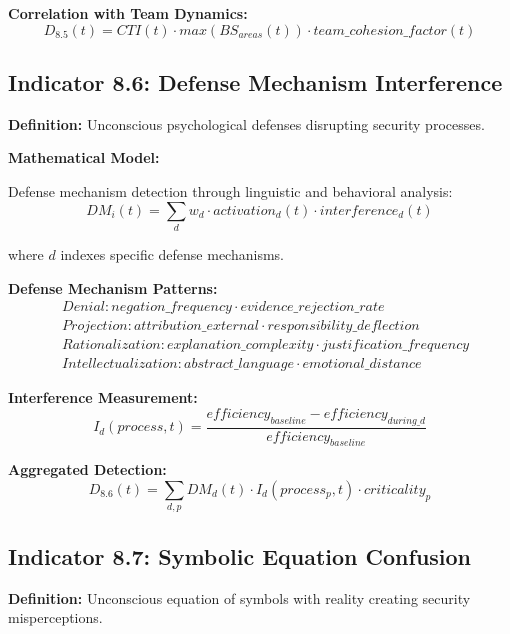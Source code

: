 \documentclass[11pt,a4paper]{article}
\begin{document}
\textbf{Correlation with Team Dynamics:}
\begin{equation}
D_{8.5}(t) = CTI(t) \cdot max(BS_{areas}(t)) \cdot team\_cohesion\_factor(t)
\end{equation}

\subsection{Indicator 8.6: Defense Mechanism Interference}

\textbf{Definition:} Unconscious psychological defenses disrupting security processes.

\textbf{Mathematical Model:}

Defense mechanism detection through linguistic and behavioral analysis:
\begin{equation}
DM_i(t) = \sum_{d} w_d \cdot activation_d(t) \cdot interference_d(t)
\end{equation}

where $d$ indexes specific defense mechanisms.

\textbf{Defense Mechanism Patterns:}
\begin{align}
&Denial: negation\_frequency \cdot evidence\_rejection\_rate \\
&Projection: attribution\_external \cdot responsibility\_deflection \\
&Rationalization: explanation\_complexity \cdot justification\_frequency \\
&Intellectualization: abstract\_language \cdot emotional\_distance
\end{align}

\textbf{Interference Measurement:}
\begin{equation}
I_d(process,t) = \frac{efficiency_{baseline} - efficiency_{during\_d}}{efficiency_{baseline}}
\end{equation}

\textbf{Aggregated Detection:}
\begin{equation}
D_{8.6}(t) = \sum_{d,p} DM_d(t) \cdot I_d(process_p,t) \cdot criticality_p
\end{equation}

\subsection{Indicator 8.7: Symbolic Equation Confusion}

\textbf{Definition:} Unconscious equation of symbols with reality creating security misperceptions.
\end{document}
